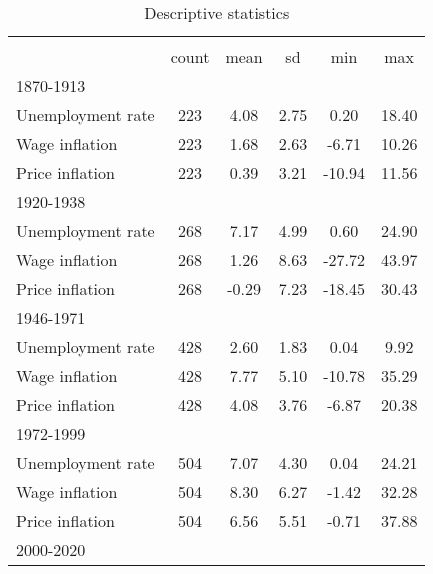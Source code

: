 \begin{table}[htbp]\centering
\def\sym#1{\ifmmode^{#1}\else\(^{#1}\)\fi}
\caption{Descriptive statistics \label{T:Descriptives}}
\begin{tabular}{l*{1}{ccccc}}
\hline\hline
                    &\multicolumn{5}{c}{}                                            \\
                    &       count&        mean&          sd&         min&         max\\
\hline
1870-1913           &            &            &            &            &            \\
Unemployment rate   &         223&        4.08&        2.75&        0.20&       18.40\\
Wage inflation      &         223&        1.68&        2.63&       -6.71&       10.26\\
Price inflation     &         223&        0.39&        3.21&      -10.94&       11.56\\
\hline
1920-1938           &            &            &            &            &            \\
Unemployment rate   &         268&        7.17&        4.99&        0.60&       24.90\\
Wage inflation      &         268&        1.26&        8.63&      -27.72&       43.97\\
Price inflation     &         268&       -0.29&        7.23&      -18.45&       30.43\\
\hline
1946-1971           &            &            &            &            &            \\
Unemployment rate   &         428&        2.60&        1.83&        0.04&        9.92\\
Wage inflation      &         428&        7.77&        5.10&      -10.78&       35.29\\
Price inflation     &         428&        4.08&        3.76&       -6.87&       20.38\\
\hline
1972-1999           &            &            &            &            &            \\
Unemployment rate   &         504&        7.07&        4.30&        0.04&       24.21\\
Wage inflation      &         504&        8.30&        6.27&       -1.42&       32.28\\
Price inflation     &         504&        6.56&        5.51&       -0.71&       37.88\\
\hline
2000-2020           &            &            &            &            &            \\

\end{tabular}
\end{table}
